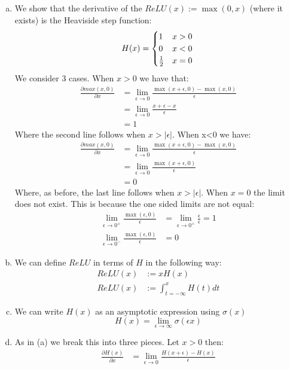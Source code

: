 \documentclass[paper=a4, fontsize=11pt]{scrartcl} %
\numberwithin{equation}{section} %
\numberwithin{figure}{section} %
\numberwithin{table}{section} %
\newcommand{\dP}[2]{\frac{\partial #1}{\partial #2}}
\begin{document}
\begin{enumerate}[(a)]
	\item We show that the derivative of the $ReLU(x) := \max(0,x)$ (where it exists) is the Heaviside step function:
	$$ H(x) = 
	\begin{cases} 
	1 & x > 0 \\
	0 & x < 0 \\ 
	\frac{1}{2} & x=0 
	\end{cases} \\
	$$
	We consider 3 cases. When $x>0$ we have that:
	\begin{align*}
	\dP{max(x,0)}{x}&=\lim\limits_{\epsilon\rightarrow0}\frac{\max(x+\epsilon,0)-\max(x,0)}{\epsilon} \\
	&=\lim\limits_{\epsilon\rightarrow0}\frac{x+\epsilon-x}{\epsilon}\\
	&= 1
	\end{align*}
	Where the second line follows when $x>|\epsilon|$. When x<0 we have:
	\begin{align*}
	\dP{max(x,0)}{x}&=\lim\limits_{\epsilon\rightarrow0}\frac{\max(x+\epsilon,0)-\max(x,0)}{\epsilon} \\
	&=\lim\limits_{\epsilon\rightarrow0}\frac{\max(x+\epsilon,0)}{\epsilon}\\
	&= 0
	\end{align*}
	Where, as before, the last line follows when $x>|\epsilon|$. When $x=0$ the limit does not exist. This is because the one sided limits are not equal:
		\begin{align*}
		\lim\limits_{\epsilon\rightarrow0^+}\frac{\max(\epsilon,0)}{\epsilon} &=\lim\limits_{\epsilon\rightarrow0^+}\frac{\epsilon}{\epsilon}= 1\\
		\lim\limits_{\epsilon\rightarrow0^-}\frac{\max(\epsilon,0)}{\epsilon} &= 0
		\end{align*}
	\item We can define $ReLU$ in terms of $H$ in the following way:
	\begin{align*}
	ReLU(x) &:= xH(x)\\
	ReLU(x) &:= \int_{t=-\infty}^{x} H(t)dt
	\end{align*} 
	\item We can write $H(x)$ as an asymptotic expression using $\sigma(x)$
	$$H(x) = 
	\lim\limits_{\epsilon \rightarrow\infty} \sigma(\epsilon x)
	$$
	\item As in (a) we break this into three pieces. Let $x>0$ then:
	\begin{align*} 
	\dP{H(x)}{x} &= \lim\limits_{\epsilon\rightarrow0}\frac{H(x+\epsilon)-H(x)}{\epsilon}\\

\end{align*}
\end{enumerate}
\end{document}
